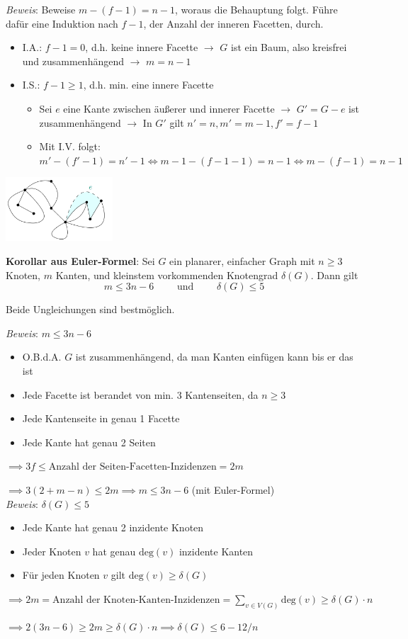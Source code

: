 \textit{Beweis}: Beweise $m-(f-1)=n-1$, woraus die Behauptung folgt. Führe dafür eine Induktion nach $f-1$, der Anzahl der inneren Facetten, durch.
\begin{itemize}
	\item I.A.: $f-1=0$, d.h. keine innere Facette $\rightarrow$ $G$ ist ein Baum, also kreisfrei und zusammenhängend $\rightarrow$ $m=n-1$
	\item I.S.: $f-1\geq 1$, d.h. min. eine innere Facette
	\begin{itemize}
		\item Sei $e$ eine Kante zwischen äußerer und innerer Facette $\rightarrow$ $G'=G-e$ ist zusammenhängend $\rightarrow$ In $G'$ gilt $n'=n,m'=m-1,f'=f-1$
		\item Mit I.V. folgt: $m'-(f'-1)=n'-1\Leftrightarrow m-1-(f-1-1)=n-1 \Leftrightarrow m-(f-1)=n-1$
	\end{itemize}
\end{itemize}
\begin{center}
	\includegraphics[width=0.3\textwidth]{images/euler-proof.png}
\end{center}
\bigskip
\textbf{Korollar aus Euler-Formel}: Sei $G$ ein planarer, einfacher Graph mit $n\geq 3$ Knoten, $m$ Kanten, und kleinstem vorkommenden Knotengrad $\delta(G)$.
Dann gilt 
$$m\leq 3n-6\qquad\text{ und }\qquad \delta(G)\leq 5$$

Beide Ungleichungen sind bestmöglich.

\pagebreak
\textit{Beweis}: $m\leq 3n-6$
\begin{itemize}
	\item O.B.d.A. $G$ ist zusammenhängend, da man Kanten einfügen kann bis er das ist
	\item Jede Facette ist berandet von min. 3 Kantenseiten, da $n\geq 3$ 
	\item Jede Kantenseite in genau 1 Facette
	\item Jede Kante hat genau 2 Seiten
\end{itemize}
$\implies 3f\leq \text{Anzahl der Seiten-Facetten-Inzidenzen} =2m$

$\implies 3(2+m-n)\leq 2m \implies m\leq 3n-6$ (mit Euler-Formel)\\

\textit{Beweis}: $\delta(G)\leq 5$
\begin{itemize}
	\item Jede Kante hat genau 2 inzidente Knoten
	\item Jeder Knoten $v$ hat genau $\text{deg}(v)$ inzidente Kanten
	\item Für jeden Knoten $v$ gilt $\text{deg}(v)\geq\delta(G)$
\end{itemize}
$\implies 2m=\text{Anzahl der Knoten-Kanten-Inzidenzen}=\sum\limits_{v\in V(G)}\text{deg}(v)\geq \delta(G)\cdot n$

$\implies 2(3n-6)\geq 2m\geq \delta(G)\cdot n \implies \delta(G)\leq 6-12/n$

